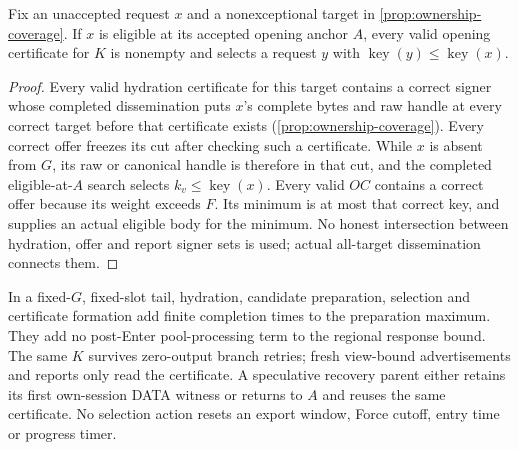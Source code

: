 \begin{proposition}
\label{prop:opening-coverage}
Fix an unaccepted request $x$ and a nonexceptional target in
\cref{prop:ownership-coverage}. If $x$ is eligible at its accepted opening
anchor $A$, every valid opening certificate for $K$ is nonempty and
selects a request $y$ with
$\operatorname{key}(y)\le\operatorname{key}(x)$.
\end{proposition}
\begin{proof}
Every valid hydration certificate for this target contains a correct
signer whose completed dissemination puts $x$'s complete bytes and
raw handle at every correct target before that certificate exists
(\cref{prop:ownership-coverage}). Every correct offer freezes its cut
after checking such a certificate. While $x$ is absent from $G$, its
raw or canonical handle is therefore in that cut, and the completed
eligible-at-$A$ search selects $k_v\le\operatorname{key}(x)$.
Every valid $\mathit{OC}$ contains a correct offer because its weight
exceeds $F$. Its minimum is at most that correct key, and
 supplies an actual eligible body for the minimum.
No honest intersection between hydration, offer and report signer
sets is used; actual all-target dissemination connects them.
\end{proof}

In a fixed-$G$, fixed-slot tail, hydration, candidate preparation,
selection and certificate formation add finite completion times to
the preparation maximum. They add no post-Enter pool-processing term
to the regional response bound. The same $K$ survives zero-output
branch retries; fresh view-bound advertisements and reports only read
the certificate. A speculative recovery parent either retains its
first own-session DATA witness or returns to $A$ and reuses the same
certificate. No selection action resets an export window, Force cutoff,
entry time or progress timer.
